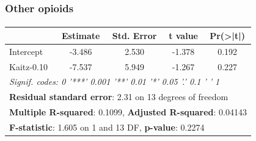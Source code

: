 \begin{frame}[shrink=5]

    \label{table_otheropioids}
    
    \frametitle{Other opioids} %
    \framesubtitle{}  %
    \rmfamily %

    \begin{table}[ht]
        \centering
        \begin{tabular}{lcccc}
        \toprule
         & \textbf{Estimate} & \textbf{Std. Error} & \textbf{t value} & \textbf{Pr(>|t|)} \\
        \midrule
        Intercept  & -3.486 & 2.530 & -1.378 & 0.192 \\
        Kaitz-0.10 & -7.537 & 5.949 & -1.267 & 0.227 \\
        \midrule
        \multicolumn{5}{l}{\textit{Signif. codes:  0 '***' 0.001 '**' 0.01 '*' 0.05 '.' 0.1 ' ' 1}} \\
        \midrule
        \multicolumn{5}{l}{\textbf{Residual standard error}: 2.31 on 13 degrees of freedom} \\
        \multicolumn{5}{l}{\textbf{Multiple R-squared}: 0.1099, \textbf{Adjusted R-squared}: 0.04143} \\
        \multicolumn{5}{l}{\textbf{F-statistic}: 1.605 on 1 and 13 DF, \textbf{p-value}: 0.2274} \\
        \bottomrule
        \end{tabular}
    \end{table}
    
    \hyperlink{heroin_result}{}
    
\end{frame}

